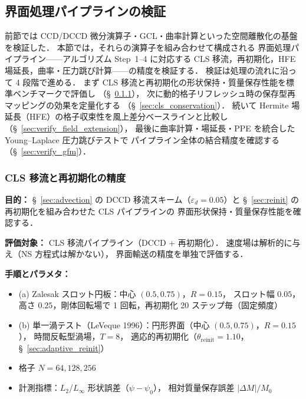 %

\subsection{界面処理パイプラインの検証}
\label{sec:verify_interface}

前節では CCD/DCCD 微分演算子・GCL・曲率計算といった空間離散化の基盤を検証した．
本節では，それらの演算子を組み合わせて構成される
界面処理パイプライン——アルゴリズム Step~1--4 に対応する
CLS 移流，再初期化，HFE 場延長，曲率・圧力跳び計算——の精度を検証する．
検証は処理の流れに沿って 4 段階で進める．
まず CLS 移流と再初期化の形状保持・質量保存性能を標準ベンチマークで評価し
（§~\ref{sec:verify_cls_advection}），
次に動的格子リフレッシュ時の保存型再マッピングの効果を定量化する
（§~\ref{sec:cls_conservation}）．
続いて Hermite 場延長（HFE）の格子収束性を風上差分ベースラインと比較し
（§~\ref{sec:verify_field_extension}），
最後に曲率計算・場延長・PPE を統合した Young--Laplace 圧力跳びテストで
パイプライン全体の結合精度を確認する（§~\ref{sec:verify_gfm}）．


\subsubsection{CLS 移流と再初期化の精度}
\label{sec:verify_cls_advection}

\noindent\textbf{目的：}
§~\ref{sec:advection} の DCCD 移流スキーム（$\varepsilon_d = 0.05$）と
§~\ref{sec:reinit} の再初期化を組み合わせた CLS パイプラインの
界面形状保持・質量保存性能を確認する．

\noindent\textbf{評価対象：}
CLS 移流パイプライン（DCCD + 再初期化）．
速度場は解析的に与え（NS 方程式は解かない），
界面輸送の精度を単独で評価する．

\noindent\textbf{手順とパラメタ：}
\begin{itemize}[noitemsep]
  \item (a) Zalesak スロット円板：中心 $(0.5, 0.75)$，$R = 0.15$，
        スロット幅 $0.05$，高さ $0.25$，剛体回転場で 1 回転，再初期化 20 ステップ毎（固定頻度）
  \item (b) 単一渦テスト（LeVeque 1996）：円形界面（中心 $(0.5, 0.75)$，$R = 0.15$），
        時間反転型渦場，$T = 8$，
        適応的再初期化（$\theta_{\mathrm{reinit}} = 1.10$，§~\ref{sec:adaptive_reinit}）
  \item 格子 $N = 64, 128, 256$
  \item 計測指標：$L_2$/$L_\infty$ 形状誤差（$\psi - \psi_0$），
        相対質量保存誤差 $|\Delta M|/M_0$
\end{itemize}

